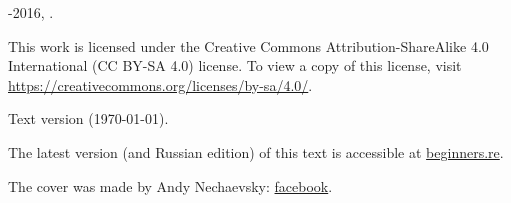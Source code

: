 ﻿	\begin{titlepage}


\end{titlepage}

\newpage

\begin{center}
\vspace*{\fill}
{\LARGE \TITLE}

\vspace*{\fill}

{\large \AUTHOR}

{\large \TT{<\EMAIL>}}
\vspace*{\fill}
\vfill

\ccbysa

-2016, \AUTHOR. 

This work is licensed under the Creative Commons Attribution-ShareAlike 4.0 International (CC BY-SA 4.0) license.
To view a copy of this license, visit \url{https://creativecommons.org/licenses/by-sa/4.0/}.

Text version ({\large \today}).

The latest version (and Russian edition) of this text is accessible at \href{http://go.yurichev.com/17009}{beginners.re}.

The cover was made by Andy Nechaevsky: \href{http://go.yurichev.com/17023}{facebook}.

\end{center}
